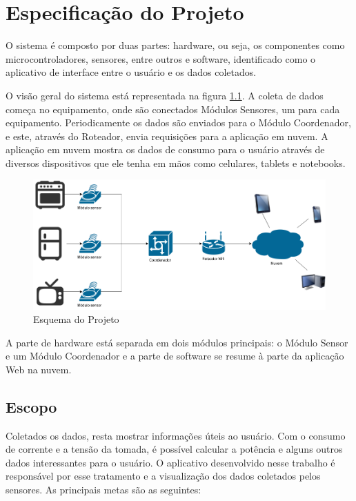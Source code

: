 \chapter{Especificação do Projeto}
\label{Cap:especificacao}

O sistema é composto por duas partes: hardware, ou seja, os componentes como microcontroladores, sensores, entre outros e software, identificado como o aplicativo de interface entre o usuário e os dados coletados.

O visão geral do sistema está representada na figura \ref{fig:esqueminha}. A coleta de dados começa no equipamento, onde são conectados Módulos Sensores, um para cada equipamento. Periodicamente os dados são enviados para o Módulo Coordenador, e este, através do Roteador, envia requisições para a aplicação em nuvem. A aplicação em nuvem mostra os dados de consumo para o usuário através de diversos dispositivos que ele tenha em mãos como celulares, tablets e notebooks.

\begin{figure}[H]
\centering
\includegraphics[width=1\textwidth]{figuras/esqueminha.png}
\caption{\label{fig:esqueminha} Esquema do Projeto}
\end{figure}

A parte de hardware está separada em dois módulos principais: o Módulo Sensor e um Módulo Coordenador e a parte de software se resume à parte da aplicação Web na nuvem.



\section{Escopo}

Coletados os dados, resta mostrar informações úteis ao usuário. Com o consumo de corrente e a tensão da tomada, é possível calcular a potência e alguns outros dados interessantes para o usuário. O aplicativo desenvolvido nesse trabalho é responsável por esse tratamento e a visualização dos dados coletados pelos sensores. As principais metas são as seguintes:

